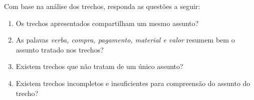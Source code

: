 

\vspace{0.5 cm} 
\noindent Com base na análise dos trechos, responda as questões a seguir:
\vspace{0.5 cm} 



\begin{enumerate}



\item Os trechos apresentados compartilham um mesmo assunto?
\likertB




\item As palavas \textit{verba, compra, pagamento, material e valor} resumem bem o assunto tratado nos trechos?
\likertB




\item Existem trechos que não tratam de um único assunto?
\likertA



\item Existem trechos incompletos e insuficientes para compreensão do assunto do trecho?
\likertA



\end{enumerate}







%
%
%
%
%
















